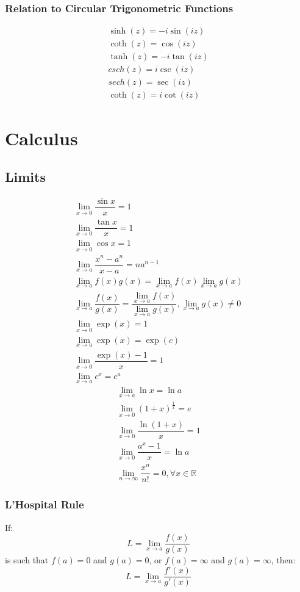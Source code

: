 \documentclass[openany, oneside]{book}
\begin{document}
\section{Relation to Circular Trigonometric Functions}
\begin{align}
\sinh (z)=-i\sin (iz)\\
\coth (z)= \cos (iz)\\
\tanh (z)=-i \tan (iz)\\
csch (z)=i\csc (iz)\\
sech (z)=\sec (iz)\\
\coth (z)=i\cot (iz)
\end{align}

\part{Calculus}
\large{\chapter{Limits}}
\begin{align}
\lim_{x\to0} \dfrac{\sin x}{x}=1\\
\lim_{x\to0} \dfrac{\tan x}{x}=1\\
\lim_{x\to0} \cos x=1\\
\lim_{x\to a} \dfrac{x^n-a^n}{x-a}=na^{n-1}\\
\lim_{x\to a} f(x)g(x)=\lim_{x\to a} f(x)\lim_{x\to a} g(x)\\
\lim_{x\to a} \dfrac{f(x)}{g(x)}=\dfrac{\lim_{x\to a} f(x)}{\lim_{x\to a} g(x)}, \lim_{x\to a} g(x) \neq 0\\
\lim_{x\to0} \exp(x)=1\\
\lim_{x\to a} \exp(x)=\exp(c)\\
\lim_{x\to0} \dfrac{\exp(x)-1}{x}=1\\
\lim_{x\to a} c^x=c^a
\end{align}
\begin{align}
\lim_{x\to a} \ln x=\ln a\\
\lim_{x\to0} (1+x)^{\frac{1}{x}}=e\\
\lim_{x\to0} \dfrac{\ln (1+x)}{x}=1\\
\lim_{x\to0} \dfrac{a^x-1}{x}=\ln a\\
\lim_{n\to\infty} \dfrac{x^n}{n!}=0, \forall x\in\mathbb{R}
\end{align}

\section{L'Hospital Rule}
If:
\begin{equation}
L=\lim_{x\to a} \dfrac{f(x)}{g(x)}\nonumber
\end{equation}
is such that $f(a)=0$ and $g(a)=0$, or $f(a)=\infty$ and $g(a)=\infty$, then:
\begin{equation}
L=\lim_{x\to a} \dfrac{f'(x)}{g'(x)}\nonumber
\end{equation}
\end{document}
